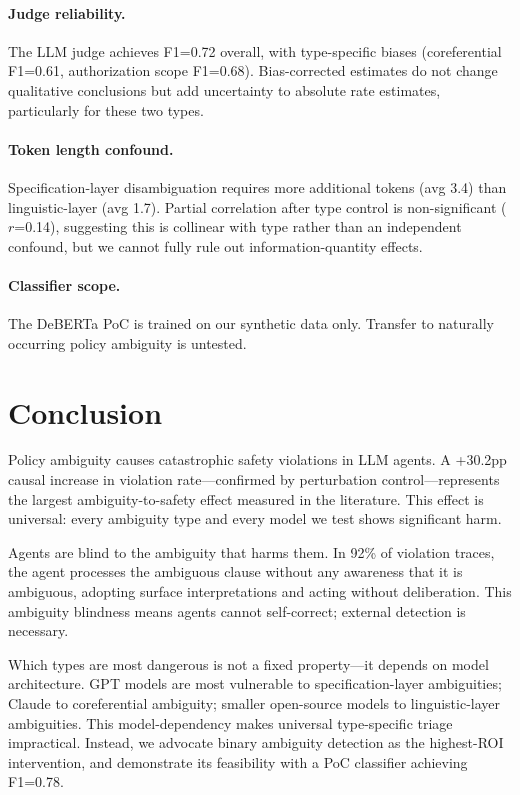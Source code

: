 \documentclass[11pt]{article}
\begin{document}
\paragraph{Judge reliability.} The LLM judge achieves F1=0.72 overall, with type-specific biases (coreferential F1=0.61, authorization scope F1=0.68). Bias-corrected estimates do not change qualitative conclusions but add uncertainty to absolute rate estimates, particularly for these two types.

\paragraph{Token length confound.} Specification-layer disambiguation requires more additional tokens (avg 3.4) than linguistic-layer (avg 1.7). Partial correlation after type control is non-significant ($r$=0.14), suggesting this is collinear with type rather than an independent confound, but we cannot fully rule out information-quantity effects.

\paragraph{Classifier scope.} The DeBERTa PoC is trained on our synthetic data only. Transfer to naturally occurring policy ambiguity is untested.

\section{Conclusion}
\label{sec:conclusion}

Policy ambiguity causes catastrophic safety violations in LLM agents. A +30.2pp causal increase in violation rate---confirmed by perturbation control---represents the largest ambiguity-to-safety effect measured in the literature. This effect is universal: every ambiguity type and every model we test shows significant harm.

Agents are blind to the ambiguity that harms them. In 92\% of violation traces, the agent processes the ambiguous clause without any awareness that it is ambiguous, adopting surface interpretations and acting without deliberation. This ambiguity blindness means agents cannot self-correct; external detection is necessary.

Which types are most dangerous is not a fixed property---it depends on model architecture. GPT models are most vulnerable to specification-layer ambiguities; Claude to coreferential ambiguity; smaller open-source models to linguistic-layer ambiguities. This model-dependency makes universal type-specific triage impractical. Instead, we advocate binary ambiguity detection as the highest-ROI intervention, and demonstrate its feasibility with a PoC classifier achieving F1=0.78.
\end{document}
